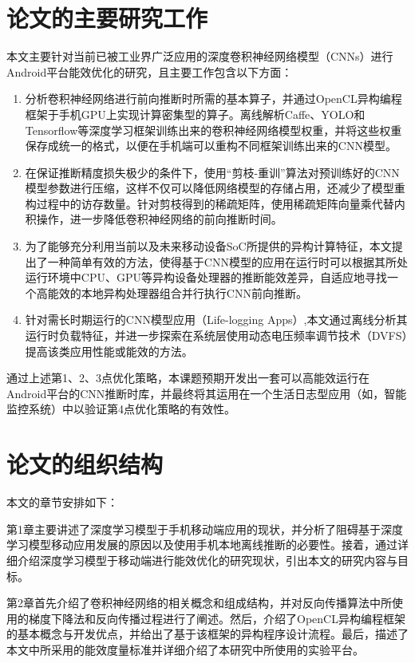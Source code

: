 \section{论文的主要研究工作}
本文主要针对当前已被工业界广泛应用的深度卷积神经网络模型（CNNs）进行Android平台能效优化的研究，且主要工作包含以下方面：
\begin{enumerate}
\item 分析卷积神经网络进行前向推断时所需的基本算子，并通过OpenCL异构编程框架于手机GPU上实现计算密集型的算子。离线解析Caffe、YOLO\cite{redmon2016you}和Tensorflow\cite{abadi2016tensorflow}等深度学习框架训练出来的卷积神经网络模型权重，并将这些权重保存成统一的格式，以便在手机端可以重构不同框架训练出来的CNN模型。
\item 在保证推断精度损失极少的条件下，使用“剪枝-重训”算法对预训练好的CNN模型参数进行压缩，这样不仅可以降低网络模型的存储占用，还减少了模型重构过程中的访存数量。针对剪枝得到的稀疏矩阵，使用稀疏矩阵向量乘代替内积操作，进一步降低卷积神经网络的前向推断时间。
\item 为了能够充分利用当前以及未来移动设备SoC所提供的异构计算特征，本文提出了一种简单有效的方法，使得基于CNN模型的应用在运行时可以根据其所处运行环境中CPU、GPU等异构设备处理器的推断能效差异，自适应地寻找一个高能效的本地异构处理器组合并行执行CNN前向推断。
\item 针对需长时期运行的CNN模型应用（Life-logging Apps）,本文通过离线分析其运行时负载特征，并进一步探索在系统层使用动态电压频率调节技术（DVFS）提高该类应用性能或能效的方法。
\end{enumerate}

通过上述第1、2、3点优化策略，本课题预期开发出一套可以高能效运行在Android平台的CNN推断时库，并最终将其运用在一个生活日志型应用（如，智能监控系统）中以验证第4点优化策略的有效性。

\section{论文的组织结构}

本文的章节安排如下：

第1章主要讲述了深度学习模型于手机移动端应用的现状，并分析了阻碍基于深度学习模型移动应用发展的原因以及使用手机本地离线推断的必要性。接着，通过详细介绍深度学习模型于移动端进行能效优化的研究现状，引出本文的研究内容与目标。

第2章首先介绍了卷积神经网络的相关概念和组成结构，并对反向传播算法中所使用的梯度下降法和反向传播过程进行了阐述。然后，介绍了OpenCL异构编程框架的基本概念与开发优点，并给出了基于该框架的异构程序设计流程。最后，描述了本文中所采用的能效度量标准并详细介绍了本研究中所使用的实验平台。

